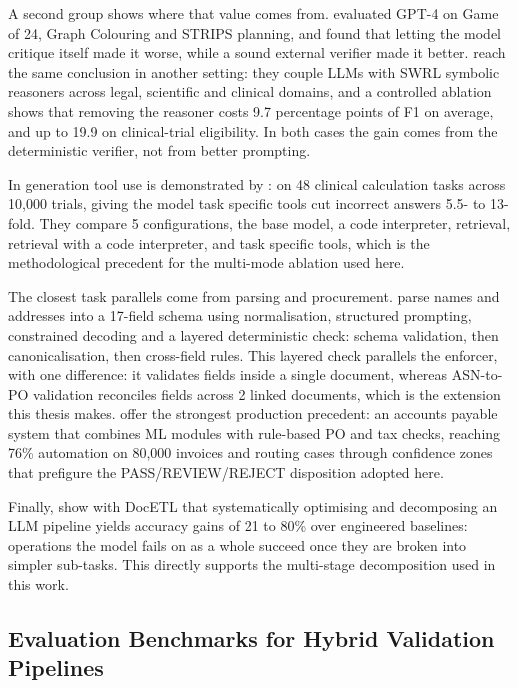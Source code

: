 A second group shows where that value comes from. \citet{stechly2024} evaluated GPT-4 on Game of 24, Graph Colouring and STRIPS planning, and found that letting the model critique itself made it worse, while a sound external verifier made it better. \citet{sadowski2026} reach the same conclusion in another setting: they couple LLMs with SWRL symbolic reasoners across legal, scientific and clinical domains, and a controlled ablation shows that removing the reasoner costs 9.7 percentage points of F1 on average, and up to 19.9 on clinical-trial eligibility. In both cases the gain comes from the deterministic verifier, not from better prompting.

In generation tool use is demonstrated by \citet{goodell2025}: on 48 clinical calculation tasks across 10,000 trials, giving the model task specific tools cut incorrect answers 5.5- to 13-fold. They compare 5 configurations, the base model, a code interpreter, retrieval, retrieval with a code interpreter, and task specific tools, which is the methodological precedent for the multi-mode ablation used here.

The closest task parallels come from parsing and procurement. \citet{tarannum2026} parse names and addresses into a 17-field schema using normalisation, structured prompting, constrained decoding and a layered deterministic check: schema validation, then canonicalisation, then cross-field rules. This layered check parallels the enforcer, with one difference: it validates fields inside a single document, whereas ASN-to-PO validation reconciles fields across 2 linked documents, which is the extension this thesis makes. \citet{kanaparthi2023} offer the strongest production precedent: an accounts payable system that combines ML modules with rule-based PO and tax checks, reaching 76\% automation on 80,000 invoices and routing cases through confidence zones that prefigure the PASS/REVIEW/REJECT disposition adopted here.

Finally, \citet{shankar2025} show with DocETL that systematically optimising and decomposing an LLM pipeline yields accuracy gains of 21 to 80\% over engineered baselines: operations the model fails on as a whole succeed once they are broken into simpler sub-tasks. This directly supports the multi-stage decomposition used in this work.


\subsection{Evaluation Benchmarks for Hybrid Validation Pipelines}
\label{sec:lr:sota:benchmarks}

